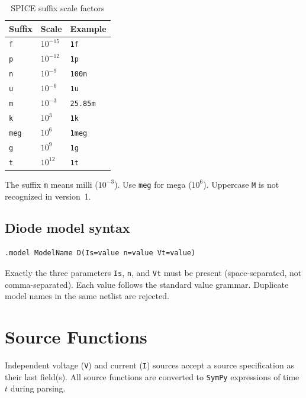 \documentclass[11pt,a4paper]{article}
\newcommand{\code}[1]{\texttt{#1}}
\newcommand{\sympy}{\texttt{SymPy}}
\begin{document}
\begin{table}[H]
\centering
\caption{SPICE suffix scale factors}
\label{tab:suffixes}
\begin{tabular}{lll}
\toprule
Suffix & Scale & Example \\
\midrule
\code{f}   & \(10^{-15}\) & \code{1f}    \\
\code{p}   & \(10^{-12}\) & \code{1p}    \\
\code{n}   & \(10^{-9}\)  & \code{100n}  \\
\code{u}   & \(10^{-6}\)  & \code{1u}    \\
\code{m}   & \(10^{-3}\)  & \code{25.85m}\\
\code{k}   & \(10^{3}\)   & \code{1k}    \\
\code{meg} & \(10^{6}\)   & \code{1meg}  \\
\code{g}   & \(10^{9}\)   & \code{1g}    \\
\code{t}   & \(10^{12}\)  & \code{1t}    \\
\bottomrule
\end{tabular}
\end{table}

The suffix \code{m} means milli (\(10^{-3}\)).
Use \code{meg} for mega (\(10^{6}\)).
Uppercase \code{M} is not recognized in version~1.

\subsection{Diode model syntax}

\begin{lstlisting}[language=spice]
.model ModelName D(Is=value n=value Vt=value)
\end{lstlisting}

Exactly the three parameters \code{Is}, \code{n}, and \code{Vt} must be
present (space-separated, not comma-separated).
Each value follows the standard value grammar.
Duplicate model names in the same netlist are rejected.

\section{Source Functions}
\label{sec:sources}

Independent voltage (\code{V}) and current (\code{I}) sources accept
a source specification as their last field(s).
All source functions are converted to \sympy{} expressions of time \(t\)
during parsing.
\end{document}
